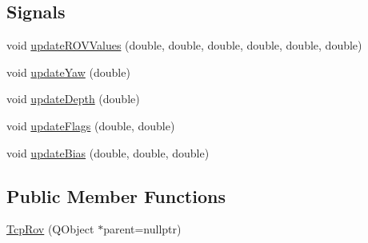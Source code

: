 \subsection*{Signals}
\begin{DoxyCompactItemize}
\item 
void \mbox{\hyperlink{class_tcp_rov_aa5f708b5730bfbcf64a5a518dac5e473}{update\+R\+O\+V\+Values}} (double, double, double, double, double, double)
\item 
void \mbox{\hyperlink{class_tcp_rov_a35dad4ad0097ef7a4ca3f47b0d907bf3}{update\+Yaw}} (double)
\item 
void \mbox{\hyperlink{class_tcp_rov_ab201a7065564d4eab11ac71f101c47ff}{update\+Depth}} (double)
\item 
void \mbox{\hyperlink{class_tcp_rov_a3b76d01ab849c7072c9357258d93ffa2}{update\+Flags}} (double, double)
\item 
void \mbox{\hyperlink{class_tcp_rov_acd0dd0bc4120b971aada9453edfea572}{update\+Bias}} (double, double, double)
\end{DoxyCompactItemize}
\subsection*{Public Member Functions}
\begin{DoxyCompactItemize}
\item 
\mbox{\hyperlink{class_tcp_rov_a42796567a8cef8574d08b33cac3a200b}{Tcp\+Rov}} (Q\+Object $\ast$parent=nullptr)
\end{DoxyCompactItemize}
